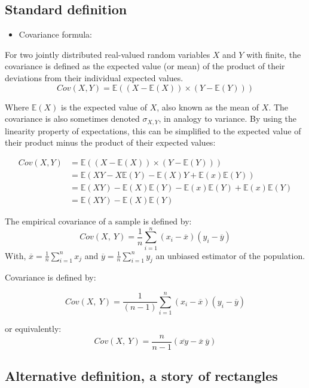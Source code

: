 \documentclass[
]{report}
\providecommand{\tightlist}{%
  \setlength{\itemsep}{0pt}\setlength{\parskip}{0pt}}
\begin{document}
\hypertarget{standard-definition}{%
\subsection{Standard definition}\label{standard-definition}}

\begin{itemize}
\tightlist
\item
  Covariance formula:
\end{itemize}

For two jointly distributed real-valued random variables \(X\) and \(Y\) with finite, the covariance is defined as the expected value (or mean) of the product of their deviations from their individual expected values.
\[
Cov(X,Y)=\mathbb{E}((X-\mathbb{E}(X))\times(Y-\mathbb{E}(Y)))
\]

Where \(\mathbb{E}(X)\) is the expected value of \(X\), also known as the mean of \(X\). The covariance is also sometimes denoted \(\sigma_{X,Y}\), in analogy to variance. By using the linearity property of expectations, this can be simplified to the expected value of their product minus the product of their expected values:

\begin{align*}
  Cov(X,Y) &=\mathbb{E}((X-\mathbb{E}(X))\times(Y-\mathbb{E}(Y))) \\
  &=\mathbb{E}(XY- X\mathbb{E}(Y) - \mathbb{E}(X)Y + \mathbb{E}(x)\mathbb{E}(Y)) \\
  &= \mathbb{E}(XY) - \mathbb{E}(X)\mathbb{E}(Y) - \mathbb{E}(x)\mathbb{E}(Y) + \mathbb{E}(x)\mathbb{E}(Y) \\
  &= \mathbb{E}(XY)-\mathbb{E}(X)\mathbb{E}(Y)
\end{align*}

The empirical covariance of a sample is defined by:
\[
Cov(X,~Y)=\frac{1}{n}
\sum_{i=1}^{n} (x_i-\overline{x})(y_i -\overline{y})
\]
With, \(\overline{x}=\frac{1}{n}\sum_{i=1}^{n} x_j\) and \(\overline{y}=\frac{1}{n}\sum_{i=1}^{n} y_j\)
an unbiased estimator of the population.

Covariance is defined by:

\[
Cov(X,~Y)=\frac{1}{(n-1)}
\sum_{i=1}^{n} (x_i-\overline{x})(y_i -\overline{y})
\]

or equivalently:
\[
Cov(X,~Y)=\frac{n}{n-1}(\overline{xy}-\overline{x}~\overline{y})
\]

\hypertarget{alternative-definition-a-story-of-rectangles}{%
\subsection{Alternative definition, a story of rectangles}\label{alternative-definition-a-story-of-rectangles}}
\end{document}
